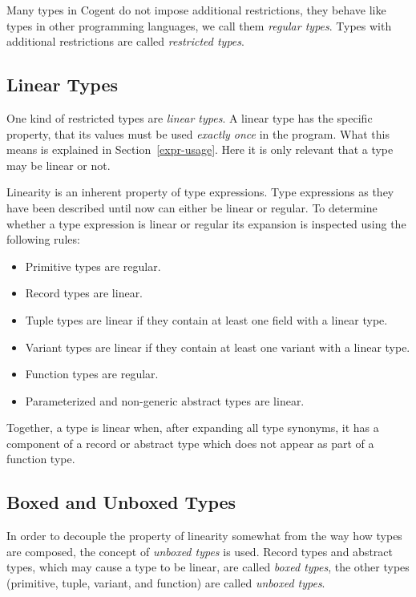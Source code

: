\documentclass[a4paper]{report}
\newcommand{\cogent}{Cogent\xspace}
\begin{document}
Many types in \cogent do not impose additional restrictions, they behave like types in other programming languages,
we call them \textit{regular types}. Types with additional restrictions are called \textit{restricted types}.

\subsection{Linear Types}

One kind of restricted types are \textit{linear types}. A linear type has the specific property, that its values must 
be used \textit{exactly once} in the program. What this means is explained in Section~\ref{expr-usage}. Here it is 
only relevant that a type may be linear or not.

Linearity is an inherent property of type expressions. Type expressions as they have been described until now can either
be linear or regular. To determine whether a type expression is linear or regular 
its expansion is inspected using the following rules:
\begin{itemize}
\item Primitive types are regular.
\item Record types are linear.
\item Tuple types are linear if they contain at least one field with a linear type.
\item Variant types are linear if they contain at least one variant with a linear type.
\item Function types are regular.
\item Parameterized and non-generic abstract types are linear.
\end{itemize}

Together, a type is linear when, after expanding all type synonyms, it has a component of a record or abstract type
which does not appear as part of a function type.

\subsection{Boxed and Unboxed Types}

In order to decouple the property of linearity somewhat from the way how types are composed, the concept of 
\textit{unboxed types} is used. Record types and abstract types, which may cause a type to be linear, are
called \textit{boxed types}, the other types (primitive, tuple, variant, and function) are called \textit{unboxed types}.
\end{document}
